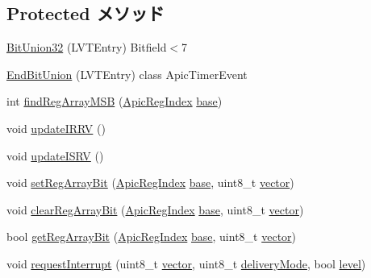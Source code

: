 \subsection*{Protected メソッド}
\begin{DoxyCompactItemize}
\item 
\hyperlink{classX86ISA_1_1Interrupts_af3c3b79e5ae32617b335938e6717ea0e}{BitUnion32} (LVTEntry) Bitfield$<$7
\item 
\hyperlink{classX86ISA_1_1Interrupts_a3dcded9d0e81db3da6da13a1ce23ef0c}{EndBitUnion} (LVTEntry) class ApicTimerEvent
\item 
int \hyperlink{classX86ISA_1_1Interrupts_a8d15a5b6dddd42176d18d4952a9c8713}{findRegArrayMSB} (\hyperlink{namespaceX86ISA_aaa839fcdf6f426c03c7382fcc29ac649}{ApicRegIndex} \hyperlink{namespaceX86ISA_a22fd87812cbb48f6d80b6cc7957490cf}{base})
\item 
void \hyperlink{classX86ISA_1_1Interrupts_a9e275b8054220a16ea40b772c0c04d96}{updateIRRV} ()
\item 
void \hyperlink{classX86ISA_1_1Interrupts_af645e39703e6f7ea975409c79fc0f41b}{updateISRV} ()
\item 
void \hyperlink{classX86ISA_1_1Interrupts_ac346555c2f6639d76b0d3730d0e216e2}{setRegArrayBit} (\hyperlink{namespaceX86ISA_aaa839fcdf6f426c03c7382fcc29ac649}{ApicRegIndex} \hyperlink{namespaceX86ISA_a22fd87812cbb48f6d80b6cc7957490cf}{base}, uint8\_\-t \hyperlink{classX86ISA_1_1Interrupts_a7ea82552101f041fad7635b3ed036a84}{vector})
\item 
void \hyperlink{classX86ISA_1_1Interrupts_a6ccfdb5e91c1463b861d5cd6cbb23c46}{clearRegArrayBit} (\hyperlink{namespaceX86ISA_aaa839fcdf6f426c03c7382fcc29ac649}{ApicRegIndex} \hyperlink{namespaceX86ISA_a22fd87812cbb48f6d80b6cc7957490cf}{base}, uint8\_\-t \hyperlink{classX86ISA_1_1Interrupts_a7ea82552101f041fad7635b3ed036a84}{vector})
\item 
bool \hyperlink{classX86ISA_1_1Interrupts_ae3b47da5f3237bda2aa53f8ae3399040}{getRegArrayBit} (\hyperlink{namespaceX86ISA_aaa839fcdf6f426c03c7382fcc29ac649}{ApicRegIndex} \hyperlink{namespaceX86ISA_a22fd87812cbb48f6d80b6cc7957490cf}{base}, uint8\_\-t \hyperlink{classX86ISA_1_1Interrupts_a7ea82552101f041fad7635b3ed036a84}{vector})
\item 
void \hyperlink{classX86ISA_1_1Interrupts_a19885e71b7427a0f49d5b006c1d7fc7f}{requestInterrupt} (uint8\_\-t \hyperlink{classX86ISA_1_1Interrupts_a7ea82552101f041fad7635b3ed036a84}{vector}, uint8\_\-t \hyperlink{classX86ISA_1_1Interrupts_aa6bdaa7818eb499f0dcf848f4ae7d569}{deliveryMode}, bool \hyperlink{namespaceX86ISA_a66adbc3470a30c6702194c0e48f2225d}{level})
\end{DoxyCompactItemize}
